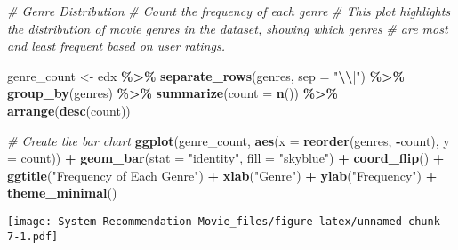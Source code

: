 \documentclass[
]{article}
\newenvironment{Shaded}{\begin{snugshade}}{\end{snugshade}}
\newcommand{\AttributeTok}[1]{\textcolor[rgb]{0.13,0.29,0.53}{#1}}
\newcommand{\CommentTok}[1]{\textcolor[rgb]{0.56,0.35,0.01}{\textit{#1}}}
\newcommand{\FunctionTok}[1]{\textcolor[rgb]{0.13,0.29,0.53}{\textbf{#1}}}
\newcommand{\NormalTok}[1]{#1}
\newcommand{\OtherTok}[1]{\textcolor[rgb]{0.56,0.35,0.01}{#1}}
\newcommand{\SpecialCharTok}[1]{\textcolor[rgb]{0.81,0.36,0.00}{\textbf{#1}}}
\newcommand{\StringTok}[1]{\textcolor[rgb]{0.31,0.60,0.02}{#1}}
\begin{document}
\begin{Shaded}
\begin{Highlighting}[]
\CommentTok{\# Genre Distribution}
\CommentTok{\# Count the frequency of each genre}
\CommentTok{\# This plot highlights the distribution of movie genres in the dataset, showing which genres }
\CommentTok{\# are most and least frequent based on user ratings.}

\NormalTok{genre\_count }\OtherTok{\textless{}{-}}\NormalTok{ edx }\SpecialCharTok{\%\textgreater{}\%}
  \FunctionTok{separate\_rows}\NormalTok{(genres, }\AttributeTok{sep =} \StringTok{"}\SpecialCharTok{\textbackslash{}\textbackslash{}}\StringTok{|"}\NormalTok{) }\SpecialCharTok{\%\textgreater{}\%}
  \FunctionTok{group\_by}\NormalTok{(genres) }\SpecialCharTok{\%\textgreater{}\%}
  \FunctionTok{summarize}\NormalTok{(}\AttributeTok{count =} \FunctionTok{n}\NormalTok{()) }\SpecialCharTok{\%\textgreater{}\%}
  \FunctionTok{arrange}\NormalTok{(}\FunctionTok{desc}\NormalTok{(count))}

\CommentTok{\# Create the bar chart}
\FunctionTok{ggplot}\NormalTok{(genre\_count, }\FunctionTok{aes}\NormalTok{(}\AttributeTok{x =} \FunctionTok{reorder}\NormalTok{(genres, }\SpecialCharTok{{-}}\NormalTok{count), }\AttributeTok{y =}\NormalTok{ count)) }\SpecialCharTok{+}
  \FunctionTok{geom\_bar}\NormalTok{(}\AttributeTok{stat =} \StringTok{"identity"}\NormalTok{, }\AttributeTok{fill =} \StringTok{"skyblue"}\NormalTok{) }\SpecialCharTok{+}
  \FunctionTok{coord\_flip}\NormalTok{() }\SpecialCharTok{+}
  \FunctionTok{ggtitle}\NormalTok{(}\StringTok{"Frequency of Each Genre"}\NormalTok{) }\SpecialCharTok{+}
  \FunctionTok{xlab}\NormalTok{(}\StringTok{"Genre"}\NormalTok{) }\SpecialCharTok{+}
  \FunctionTok{ylab}\NormalTok{(}\StringTok{"Frequency"}\NormalTok{) }\SpecialCharTok{+}
  \FunctionTok{theme\_minimal}\NormalTok{()}
\end{Highlighting}
\end{Shaded}

\texttt{[image: System-Recommendation-Movie\_files/figure-latex/unnamed-chunk-7-1.pdf]}
\end{document}
